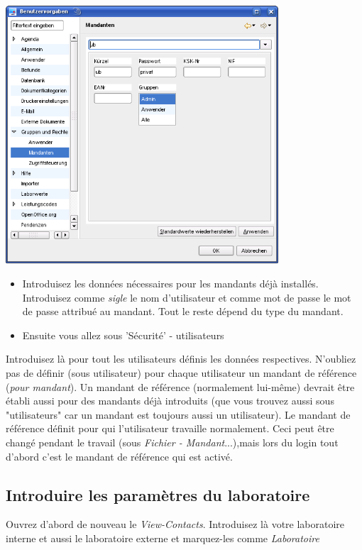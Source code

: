 \includegraphics[width=4in]{images/grundkonfmand.png}
\begin{itemize}
 \item Introduisez les données nécessaires pour les mandants déjà installés. Introduisez comme  \textit{sigle} le nom d'utilisateur et comme mot de passe le mot de passe attribué au mandant. Tout le reste dépend du type du mandant.

 \item Ensuite vous allez sous 'Sécurité' - utilisateurs
\end{itemize}

Introduisez là pour tout les utilisateurs définis les données respectives. N'oubliez pas de définir (sous utilisateur) pour chaque utilisateur un mandant de référence  (\textit{pour mandant}). Un mandant de référence (normalement lui-même) devrait être établi aussi pour des mandants déjà introduits (que vous trouvez aussi sous "utilisateurs" car un mandant est toujours aussi un utilisateur). Le mandant de référence définit pour qui l'utilisateur travaille normalement. Ceci peut être changé pendant le travail (sous  \textit{Fichier - Mandant}...),mais lors du login tout d'abord c'est le mandant de référence qui est activé.

\subsection{Introduire les paramètres du laboratoire}
Ouvrez d'abord de nouveau le \textit{View-Contacts}. Introduisez là votre laboratoire interne et aussi le laboratoire externe et marquez-les comme \textit{Laboratoire}

